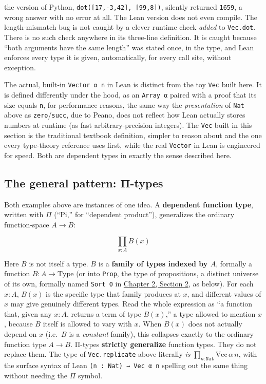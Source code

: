 the version of Python, \texttt{dot([17,-\allowbreak{}3,42], [99,8])}, silently returned \texttt{1659}, a wrong answer with no error at all. The Lean version does not even compile. The length-mismatch bug is not caught by a clever runtime check \emph{added} to \texttt{Vec.dot}. There is no such check anywhere in its three-line definition. It is caught because ``both arguments have the same length'' was stated once, in the type, and Lean enforces every type it is given, automatically, for every call site, without exception.

The actual, built-in \texttt{Vector α n} in Lean is distinct from the toy \texttt{Vec} built here. It is defined differently under the hood, as an \texttt{Array α} paired with a proof that its size equals \texttt{n}, for performance reasons, the same way the \emph{presentation} of \texttt{Nat} above as \texttt{zero}/\texttt{succ}, due to Peano, does not reflect how Lean actually stores numbers at runtime (as fast arbitrary-precision integers). The \texttt{Vec} built in this section is the traditional textbook definition, simpler to reason about and the one every type-theory reference uses first, while the real \texttt{Vector} in Lean is engineered for speed. Both are dependent types in exactly the sense described here.

\subsection{The general pattern: Π-types}\label{sec:01-basics:03-dependent-types:6}

Both examples above are instances of one idea. A \textbf{dependent function type}, written with \(\Pi\) (``Pi,'' for ``dependent product''), generalizes the ordinary function-space \(A \to B\):

\[
\prod_{x : A} B(x)
\]

Here \(B\) is not itself a type. \(B\) is a \textbf{family of types indexed by \(A\)}, formally a function \(B : A \to \mathrm{Type}\) (or into \texttt{Prop}, the type of propositions, a distinct universe of its own, formally named \texttt{Sort 0} in \hyperref[sec:02-terminology-and-coc:02-pi-sigma-and-coc:1]{Chapter 2, Section 2}, as below). For each \(x : A\), \(B(x)\) is the specific type that family produces at \(x\), and different values of \(x\) may give genuinely different types. Read the whole expression as ``a function that, given any \(x : A\), returns a term of type \(B(x)\),'' a type allowed to mention \(x\), because \(B\) itself is allowed to vary with \(x\). When \(B(x)\) does not actually depend on \(x\) (i.e.~\(B\) is a \emph{constant} family), this collapses exactly to the ordinary function type \(A \to B\). Π-types \textbf{strictly generalize} function types. They do not replace them. The type of \texttt{Vec.replicate} above literally \emph{is} \(\prod_{n : \mathtt{Nat}} \mathrm{Vec}\,\alpha\,n\), with the surface syntax of Lean \texttt{(n : Nat) → Vec α n} spelling out the same thing without needing the \(\Pi\) symbol.

